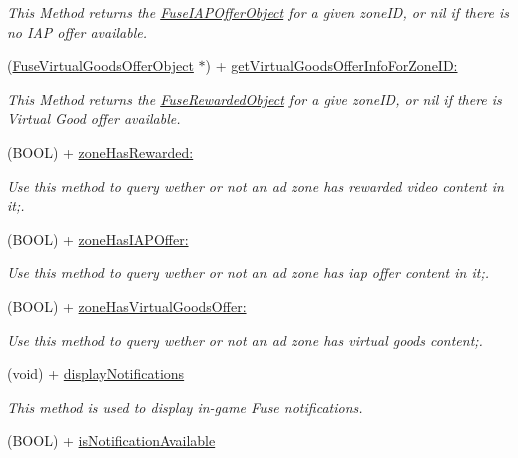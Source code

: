 \begin{DoxyCompactItemize}
\begin{DoxyCompactList}\small\item\em This Method returns the \hyperlink{interface_fuse_i_a_p_offer_object}{Fuse\+I\+A\+P\+Offer\+Object} for a given zone\+I\+D, or nil if there is no I\+A\+P offer available. \end{DoxyCompactList}\item 
(\hyperlink{interface_fuse_virtual_goods_offer_object}{Fuse\+Virtual\+Goods\+Offer\+Object} $\ast$) + \hyperlink{interface_fuse_s_d_k_a2988bfb2515b70af4aeafd4dea7ada57}{get\+Virtual\+Goods\+Offer\+Info\+For\+Zone\+I\+D\+:}
\begin{DoxyCompactList}\small\item\em This Method returns the \hyperlink{interface_fuse_rewarded_object}{Fuse\+Rewarded\+Object} for a give zone\+I\+D, or nil if there is Virtual Good offer available. \end{DoxyCompactList}\item 
(B\+O\+O\+L) + \hyperlink{interface_fuse_s_d_k_ad98a95cc63498dee7256258206808056}{zone\+Has\+Rewarded\+:}
\begin{DoxyCompactList}\small\item\em Use this method to query wether or not an ad zone has rewarded video content in it;. \end{DoxyCompactList}\item 
(B\+O\+O\+L) + \hyperlink{interface_fuse_s_d_k_adb67f99bc2972de6774949fc2849f548}{zone\+Has\+I\+A\+P\+Offer\+:}
\begin{DoxyCompactList}\small\item\em Use this method to query wether or not an ad zone has iap offer content in it;. \end{DoxyCompactList}\item 
(B\+O\+O\+L) + \hyperlink{interface_fuse_s_d_k_a898ce4e1d5235fd40627429d1f7bf138}{zone\+Has\+Virtual\+Goods\+Offer\+:}
\begin{DoxyCompactList}\small\item\em Use this method to query wether or not an ad zone has virtual goods content;. \end{DoxyCompactList}\item 
(void) + \hyperlink{interface_fuse_s_d_k_a279e4cb8e95a3e78197761156a7de50d}{display\+Notifications}
\begin{DoxyCompactList}\small\item\em This method is used to display in-\/game Fuse notifications. \end{DoxyCompactList}\item 
\hypertarget{interface_fuse_s_d_k_a23c30bc15f208daf639ece250b8a5935}{}(B\+O\+O\+L) + \hyperlink{interface_fuse_s_d_k_a23c30bc15f208daf639ece250b8a5935}{is\+Notification\+Available}\label{interface_fuse_s_d_k_a23c30bc15f208daf639ece250b8a5935}


\end{DoxyCompactItemize}
